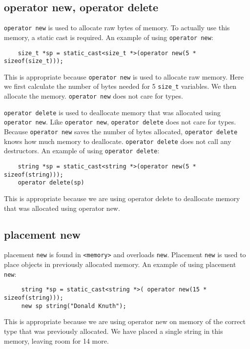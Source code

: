\subsection*{operator new, operator delete}
\texttt{operator new} is used to allocate raw bytes of memory. To actually use this memory, a static cast is required. An example of using \texttt{operator new}:
    \begin{verbatim}
    size_t *sp = static_cast<size_t *>(operator new(5 * sizeof(size_t)));
    \end{verbatim}
    This is appropriate because \texttt{operator new} is used to allocate raw memory.
    Here we first calculate the number of bytes needed for 5 \texttt{size\_t} variables. We then allocate the memory. \texttt{operator new} does not care for types.
        
    \texttt{operator delete} is used to deallocate memory that was allocated using \texttt{operator new}. Like \texttt{operator new}, \texttt{operator delete} does not care for types. Because \texttt{operator new} saves the number of bytes allocated, \texttt{operator delete} knows how much memory to deallocate. \texttt{operator delete} does not call any destructors. An example of using \texttt{operator delete}:
    \begin{verbatim}
    string *sp = static_cast<string *>(operator new(5 * sizeof(string)));
    operator delete(sp)
    \end{verbatim}
   This is appropriate because we are using operator delete to deallocate memory that was allocated using operator new.

\subsection*{placement new}
placement \texttt{new} is found in \texttt{<memory>} and overloads \texttt{new}.  Placement \texttt{new} is used to place objects in previously allocated memory.
An example of using placement \texttt{new}:
    \begin{verbatim}
     string *sp = static_cast<string *>( operator new(15 * sizeof(string)));
     new sp string("Donald Knuth");
    \end{verbatim}
This is appropriate because we are using operator new on memory of the correct type that was previously allocated. 
We have placed a single string in this memory, leaving room for 14 more.
